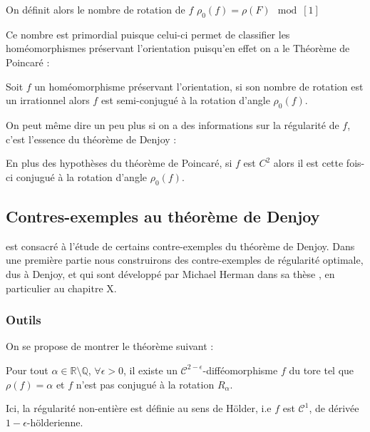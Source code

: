 \documentclass[11pt,a4paper]{article}
\begin{document}
\begin{defin}
On définit alors le nombre de rotation de $f$ $\rho_0(f) = \rho (F) \mod[1]$
\end{defin}
Ce nombre est primordial puisque celui-ci permet de classifier les homéomorphismes préservant l'orientation puisqu'en effet on a le Théorème de Poincaré :
\begin{thm}[Poincaré]\label{Théorème de Poincaré}
Soit $f$ un homéomorphisme préservant l'orientation, si son nombre de rotation est un irrationnel alors $f$ est semi-conjugué à la rotation d'angle $\rho_0(f)$.
\end{thm}
On peut même dire un peu plus si on a des informations sur la régularité de $f$, c'est l'essence du théorème de Denjoy :
\begin{thm}[Denjoy]\label{Théorème Denjoy}
En plus des hypothèses du théorème de Poincaré, si $f$ est $C^2$ alors il est cette fois-ci conjugué à la rotation d'angle $\rho_0(f)$.
\end{thm}



\subsection{Contres-exemples au théorème de Denjoy}
est consacré à l'étude de certains contre-exemples du théorème de Denjoy. Dans une première partie nous construirons des contre-exemples de régularité optimale, dus à Denjoy, et qui sont développé par Michael Herman dans sa thèse \cite{herman}, en particulier au chapitre X. 
\subsubsection{Outils}

On se propose de montrer le théorème suivant :

\begin{thm}[Denjoy]\label{cex_denjoy}
Pour tout $\alpha \in \mathbb{R} \setminus \mathbb{Q}$, $\forall \epsilon > 0$, il existe un $\mathcal{C}^{2-\epsilon}$-difféomorphisme $f$ du tore tel que $\rho(f)=\alpha$ et $f$ n'est pas conjugué à la rotation $R_\alpha$.
\end{thm}

\begin{rmq}
Ici, la  régularité non-entière est définie au sens de Hölder, i.e $f$ est $\mathcal{C}^1$, de dérivée $1-\epsilon$-hölderienne.
\end{rmq}
\end{document}
